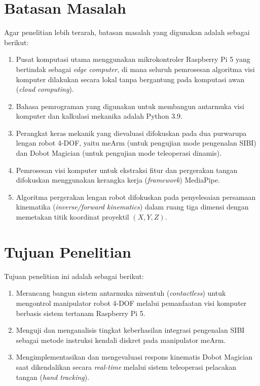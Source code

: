 \section{Batasan Masalah}
Agar penelitian lebih terarah, batasan masalah yang digunakan adalah sebagai berikut:
\begin{enumerate}[label=\arabic*.]
    \item Pusat komputasi utama menggunakan mikrokontroler Raspberry Pi 5 yang bertindak sebagai \textit{edge computer}, di mana seluruh pemrosesan algoritma visi komputer dilakukan secara lokal tanpa bergantung pada komputasi awan (\textit{cloud computing}).
    \item Bahasa pemrograman yang digunakan untuk membangun antarmuka visi komputer dan kalkulasi mekanika adalah Python 3.9.
    \item Perangkat keras mekanik yang dievaluasi difokuskan pada dua purwarupa lengan robot 4-DOF, yaitu meArm (untuk pengujian mode pengenalan SIBI) dan Dobot Magician (untuk pengujian mode teleoperasi dinamis).
    \item Pemrosesan visi komputer untuk ekstraksi fitur dan pergerakan tangan difokuskan menggunakan kerangka kerja (\textit{framework}) MediaPipe.
    \item Algoritma pergerakan lengan robot difokuskan pada penyelesaian persamaan kinematika (\textit{inverse/forward kinematics}) dalam ruang tiga dimensi dengan memetakan titik koordinat proyektil $(X,Y,Z)$.
\end{enumerate}

\section{Tujuan Penelitian}
Tujuan penelitian ini adalah sebagai berikut:
\begin{enumerate}[label=\arabic*.]
    \item Merancang bangun sistem antarmuka nirsentuh (\textit{contactless}) untuk mengontrol manipulator robot 4-DOF melalui pemanfaatan visi komputer berbasis sistem tertanam Raspberry Pi 5.
    \item Menguji dan menganalisis tingkat keberhasilan integrasi pengenalan SIBI sebagai metode instruksi kendali diskret pada manipulator meArm.
    \item Mengimplementasikan dan mengevaluasi respons kinematis Dobot Magician saat dikendalikan secara \textit{real-time} melalui sistem teleoperasi pelacakan tangan (\textit{hand tracking}).
\end{enumerate}

